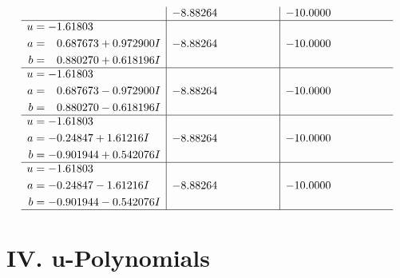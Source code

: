 \documentclass[1p]{elsarticle_modified}
\theoremstyle{definition}
\begin{document}
$$\begin{array}{c|c|c}
 & -8.88264\phantom{ +0.000000I} & -10.0000\phantom{ +0.000000I} \\ \hline\begin{aligned}
u &= -1.61803\phantom{ +0.000000I} \\
a &= \phantom{-}0.687673 + 0.972900 I \\
b &= \phantom{-}0.880270 + 0.618196 I\end{aligned}
 & -8.88264\phantom{ +0.000000I} & -10.0000\phantom{ +0.000000I} \\ \hline\begin{aligned}
u &= -1.61803\phantom{ +0.000000I} \\
a &= \phantom{-}0.687673 - 0.972900 I \\
b &= \phantom{-}0.880270 - 0.618196 I\end{aligned}
 & -8.88264\phantom{ +0.000000I} & -10.0000\phantom{ +0.000000I} \\ \hline\begin{aligned}
u &= -1.61803\phantom{ +0.000000I} \\
a &= -0.24847 + 1.61216 I \\
b &= -0.901944 + 0.542076 I\end{aligned}
 & -8.88264\phantom{ +0.000000I} & -10.0000\phantom{ +0.000000I} \\ \hline\begin{aligned}
u &= -1.61803\phantom{ +0.000000I} \\
a &= -0.24847 - 1.61216 I \\
b &= -0.901944 - 0.542076 I\end{aligned}
 & -8.88264\phantom{ +0.000000I} & -10.0000\phantom{ +0.000000I}\\
 \hline 
 \end{array}$$\newpage
\newpage\renewcommand{\arraystretch}{1}
\centering \section*{ IV. u-Polynomials}
\end{document}
